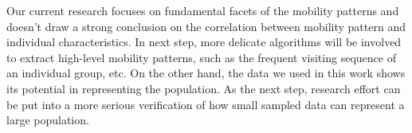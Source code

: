 Our current research focuses on fundamental facets of the mobility patterns and doesn't draw a strong conclusion on the correlation between mobility pattern and individual characteristics. In next step, more delicate algorithms will be involved to extract high-level mobility patterns, such as the frequent visiting sequence of an individual group, etc. On the other hand, the data we used in this work shows its potential in representing the population. As the next step, research effort can be put into a more serious verification of how small sampled data can represent a large population.



%




